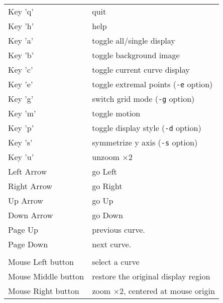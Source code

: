 \begin{tabular}{ll}
Key 'q'			& quit \\
Key 'h'			& help \\
Key 'a'			& toggle all/single display \\
Key 'b'			& toggle background image \\
Key 'c'			& toggle current curve display \\
Key 'e'			& toggle extremal points (\verb+-e+ option) \\
Key 'g'			& switch grid mode (\verb+-g+ option) \\
Key 'm'			& toggle motion \\
Key 'p'			& toggle display style (\verb+-d+ option)\\
Key 's'			& symmetrize y axis (\verb+-s+ option)\\
Key 'u'			& unzoom $\times 2$ \\
Left Arrow		& go Left\\
Right Arrow		& go Right\\
Up Arrow		& go Up\\
Down Arrow		& go Down\\
Page Up      		& previous curve.\\
Page Down    		& next curve.\\
\\
Mouse Left button 	& select a curve \\
Mouse Middle button 	& restore the original display region \\
Mouse Right button	& zoom $\times 2$, centered at mouse origin \\
\end{tabular}
